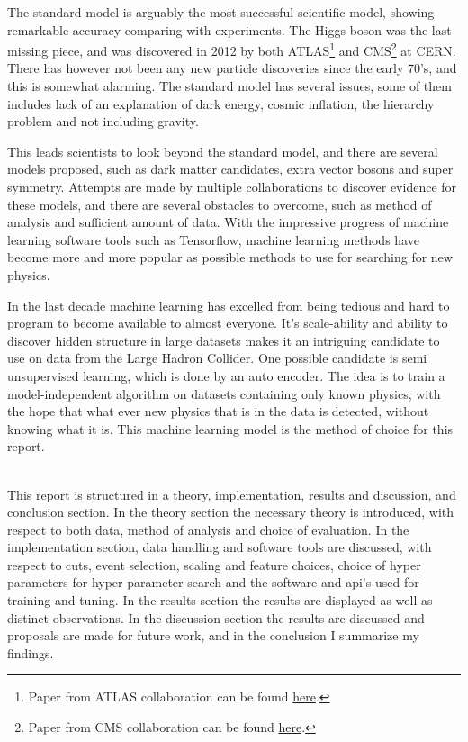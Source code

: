 \documentclass[ reprint, amsmath,amssymb, aps, nofootinbib]{revtex4-2}
\begin{document}
The standard model is arguably the most successful scientific model, showing remarkable accuracy comparing with experiments.
The Higgs boson was the last missing piece, and was discovered in 2012 by both ATLAS\footnote{Paper from ATLAS collaboration can be found \href{https://arxiv.org/abs/1207.7214}{here}.} and CMS\footnote{Paper from CMS collaboration can be found \href{https://arxiv.org/abs/1207.7235}{here}.} at CERN. There has however not been any new particle discoveries since the early 70's, and this is somewhat alarming. The standard model has several issues, some of them includes lack of an explanation of dark energy, cosmic inflation, the hierarchy problem and not including gravity. \par 
This leads scientists to look beyond the standard model, and there are several models proposed, such as dark matter candidates, extra vector bosons and super symmetry. Attempts are made by multiple collaborations to discover evidence for these models, and there are several obstacles to overcome, such as method of analysis and sufficient amount of data. With the impressive progress of machine learning software tools such as Tensorflow\cite{tensorflow2015-whitepaper}, machine learning methods have become more and more popular as possible methods  to use for searching for new physics. \par 
In the last decade machine learning has excelled from being tedious and hard to program to become available to almost everyone. It's scale-ability and ability to discover hidden structure in large datasets makes it an intriguing candidate to use on data from the Large Hadron Collider. One possible candidate is semi unsupervised learning, which is done by an auto encoder. The idea is to train a model-independent algorithm on datasets containing only known physics, with the hope that what ever new physics that is in the data is detected, without knowing what it is.  This machine learning model is the method of choice for this report. \par
\\
This report is structured in a theory, implementation, results and discussion, and conclusion section. In the theory section the necessary theory is introduced, with respect to both data, method of analysis and choice of evaluation. In the implementation section, data handling and software tools are discussed, with respect to cuts, event selection, scaling and feature choices, choice of hyper parameters for hyper parameter search and the software and api's used for training and tuning. In the results section the results are displayed as well as distinct observations. In the discussion section the results are discussed and proposals are made for future work, and in the conclusion I summarize my findings. 
\end{document}
